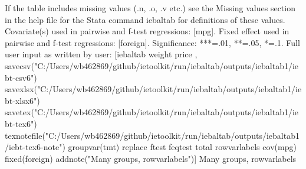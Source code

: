 If the table includes missing values (.n, .o, .v etc.) see the Missing values section in the help file for the Stata command iebaltab for definitions of these values. Covariate(s) used in pairwise and f-test regressions: [mpg]. Fixed effect used in pairwise and f-test regressions: [foreign]. Significance: ***=.01, **=.05, *=.1. Full user input as written by user: [iebaltab weight price , savecsv("C:/Users/wb462869/github/ietoolkit/run/iebaltab/outputs/iebaltab1/iebt-csv6") savexlsx("C:/Users/wb462869/github/ietoolkit/run/iebaltab/outputs/iebaltab1/iebt-xlsx6") savetex("C:/Users/wb462869/github/ietoolkit/run/iebaltab/outputs/iebaltab1/iebt-tex6") texnotefile("C:/Users/wb462869/github/ietoolkit/run/iebaltab/outputs/iebaltab1/iebt-tex6-note") groupvar(tmt) replace ftest feqtest total rowvarlabels cov(mpg) fixed(foreign) addnote("Many groups, rowvarlabels")] Many groups, rowvarlabels
